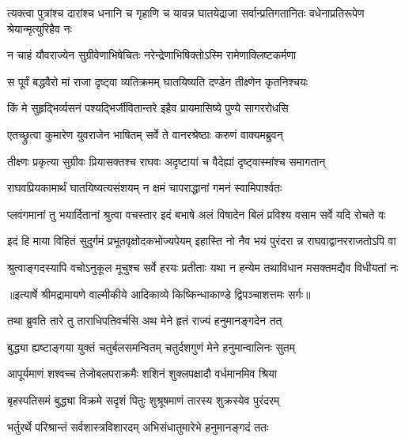 \threelineshloka
{त्यक्त्वा पुत्रांश्च दारांश्च धनानि च गृहाणि च}
{यावन्न घातयेद्राजा सर्वान्प्रतिगतानितः}
{वधेनाप्रतिरूपेण श्रेयान्मृत्युरिहैव नः} %

\twolineshloka
{न चाहं यौवराज्येन सुग्रीवेणाभिषेचितः}
{नरेन्द्रेणाभिषिक्तोऽस्मि रामेणाक्लिष्टकर्मणा} %

\twolineshloka
{स पूर्वं बद्धवैरो मां राजा दृष्ट्वा व्यतिक्रमम्}
{घातयिष्यति दण्डेन तीक्ष्णेन कृतनिश्चयः} %

\twolineshloka
{किं मे सुहृद्भिर्व्यसनं पश्यद्भिर्जीवितान्तरे}
{इहैव प्रायमासिष्ये पुण्ये सागररोधसि} %

\twolineshloka
{एतच्छ्रुत्वा कुमारेण युवराजेन भाषितम्}
{सर्वे ते वानरश्रेष्ठाः करुणं वाक्यमब्रुवन्} %

\twolineshloka
{तीक्ष्णः प्रकृत्या सुग्रीवः प्रियासक्तश्च राघवः}
{अदृष्टायां च वैदेह्यां दृष्ट्वास्मांश्च समागतान्} %

\twolineshloka
{राघवप्रियकामार्थं घातयिष्यत्यसंशयम्}
{न क्षमं चापराद्धानां गमनं स्वामिपार्श्वतः} %

\fourlineindentedshloka
{प्लवंगमानां तु भयार्दितानां}
{ श्रुत्वा वचस्तार इदं बभाषे}
{अलं विषादेन बिलं प्रविश्य}
{ वसाम सर्वे यदि रोचते वः} %

\fourlineindentedshloka
{इदं हि माया विहितं सुदुर्गमं}
{ प्रभूतवृक्षोदकभोज्यपेयम्}
{इहास्ति नो नैव भयं पुरंदरा}
{न्न राघवाद्वानरराजतोऽपि वा} %

\fourlineindentedshloka
{श्रुत्वाङ्गदस्यापि वचोऽनुकूल}
{मूचुश्च सर्वे हरयः प्रतीताः}
{यथा न हन्येम तथाविधान}
{मसक्तमद्यैव विधीयतां नः} %


{॥इत्यार्षे श्रीमद्रामायणे वाल्मीकीये आदिकाव्ये किष्किन्धाकाण्डे द्विपञ्चाशत्तमः सर्गः॥}


\twolineshloka
{तथा ब्रुवति तारे तु ताराधिपतिवर्चसि}
{अथ मेने हृतं राज्यं हनुमानङ्गदेन तत्} %

\twolineshloka
{बुद्ध्या ह्यष्टाङ्गया युक्तं चतुर्बलसमन्वितम्}
{चतुर्दशगुणं मेने हनुमान्वालिनः सुतम्} %

\twolineshloka
{आपूर्यमाणं शश्वच्च तेजोबलपराक्रमैः}
{शशिनं शुक्लपक्षादौ वर्धमानमिव श्रिया} %

\twolineshloka
{बृहस्पतिसमं बुद्ध्या विक्रमे सदृशं पितुः}
{शुश्रूषमाणं तारस्य शुक्रस्येव पुरंदरम्} %

\twolineshloka
{भर्तुरर्थे परिश्रान्तं सर्वशास्त्रविशारदम्}
{अभिसंधातुमारेभे हनुमानङ्गदं ततः} %

